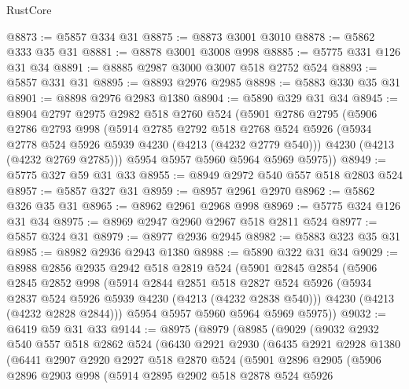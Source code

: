 \begin{lexlean}{RustCore}
\begin{coremodule}
@8873 := @5857 @334 @31
@8875 := @8873 @3001 @3010
@8878 := @5862 @333 @35 @31
@8881 := @8878 @3001 @3008 @998
@8885 := @5775 @331 @126 @31 @34
@8891 := @8885 @2987 @3000 @3007 @518 @2752 @524
@8893 := @5857 @331 @31
@8895 := @8893 @2976 @2985
@8898 := @5883 @330 @35 @31
@8901 := @8898 @2976 @2983 @1380
@8904 := @5890 @329 @31 @34
@8945 := @8904
    @2797
    @2975
    @2982
    @518
    @2760
    @524
    (@5901
      @2786
      @2795
      (@5906
        @2786
        @2793
        @998
        (@5914
          @2785
          @2792
          @518
          @2768
          @524
          @5926
          (@5934 @2778 @524 @5926 @5939 @4230 (@4213 (@4232 @2779 @540)))
          @4230
          (@4213 (@4232 @2769 @2785)))
        @5954
        @5957
        @5960
        @5964
        @5969
        @5975))
@8949 := @5775 @327 @59 @31 @33
@8955 := @8949 @2972 @540 @557 @518 @2803 @524
@8957 := @5857 @327 @31
@8959 := @8957 @2961 @2970
@8962 := @5862 @326 @35 @31
@8965 := @8962 @2961 @2968 @998
@8969 := @5775 @324 @126 @31 @34
@8975 := @8969 @2947 @2960 @2967 @518 @2811 @524
@8977 := @5857 @324 @31
@8979 := @8977 @2936 @2945
@8982 := @5883 @323 @35 @31
@8985 := @8982 @2936 @2943 @1380
@8988 := @5890 @322 @31 @34
@9029 := @8988
    @2856
    @2935
    @2942
    @518
    @2819
    @524
    (@5901
      @2845
      @2854
      (@5906
        @2845
        @2852
        @998
        (@5914
          @2844
          @2851
          @518
          @2827
          @524
          @5926
          (@5934 @2837 @524 @5926 @5939 @4230 (@4213 (@4232 @2838 @540)))
          @4230
          (@4213 (@4232 @2828 @2844)))
        @5954
        @5957
        @5960
        @5964
        @5969
        @5975))
@9032 := @6419 @59 @31 @33
@9144 := @8975
    (@8979
      (@8985
        (@9029
          (@9032
            @2932
            @540
            @557
            @518
            @2862
            @524
            (@6430
              @2921
              @2930
              (@6435
                @2921
                @2928
                @1380
                (@6441
                  @2907
                  @2920
                  @2927
                  @518
                  @2870
                  @524
                  (@5901
                    @2896
                    @2905
                    (@5906
                      @2896
                      @2903
                      @998
                      (@5914
                        @2895
                        @2902
                        @518
                        @2878
                        @524
                        @5926

\end{coremodule}
\end{lexlean}
